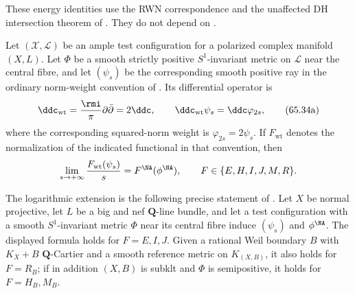 These energy identities use the RWN correspondence and the unaffected DH
intersection theorem of \cite{BHJ17}.
They do not depend on \cite[Theorem~5.6]{BHJ19}.

\noindent\begin{minipage}{\linewidth}
\begin{theorem}\label{thm:rf-bhj-unaffected-slopes}
Let $(\mathcal X,\mathcal L)$ be an ample test configuration for a
polarized complex manifold $(X,L)$.
Let $\Phi$ be a smooth strictly positive $S^1$-invariant metric on
$\mathcal L$ near the central fibre, and let $(\psi_s)$ be the
corresponding smooth positive ray in the ordinary norm-weight convention of
\cite{BHJ19}. Its differential operator is
\[
 \ddc_{\mathrm{wt}}=\frac{\rmi}{\pi}\partial\bar\partial=2\ddc,
 \qquad
 \ddc_{\mathrm{wt}}\psi_s=\ddc\varphi_{2s},
\tag{65.34a}\label{eq:rf-bhj-curvature-conversion}
\]
where the corresponding squared-norm weight is $\varphi_{2s}=2\psi_s$.
If $F_{\mathrm{wt}}$ denotes the normalization of the indicated
functional in that convention, then
\[
 \lim_{s\to+\infty}\frac{F_{\mathrm{wt}}(\psi_s)}s
       =F^{\NA}(\phi^{\NA}),
 \qquad F\in\{E,H,I,J,M,R\}.
\]

The logarithmic extension is the following precise statement of
\cite[Theorem~4.2]{BHJ19}.  Let $X$ be normal projective, let $L$ be a
big and nef $\mathbf Q$-line bundle, and let a test configuration with a
smooth $S^1$-invariant metric $\Phi$ near its central fibre induce
$(\psi_s)$ and $\phi^{\NA}$.  The displayed formula holds for
$F=E,I,J$.  Given a rational Weil boundary $B$ with $K_X+B$ $\mathbf Q$-Cartier
and a smooth reference metric on $K_{(X,B)}$, it also holds for $F=R_B$; if in addition $(X,B)$ is
subklt and $\Phi$ is semipositive, it holds for $F=H_B,M_B$.
\end{theorem}
\end{minipage}\par

